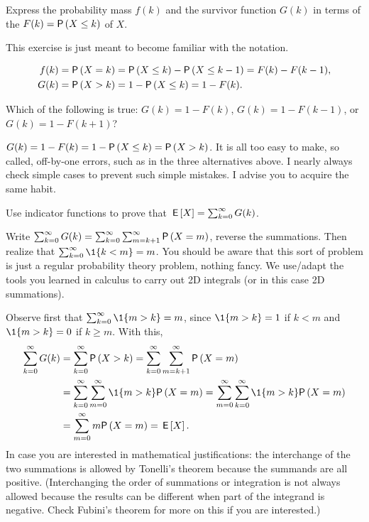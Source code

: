 \begin{exercise}
  Express the probability mass  $f(k)$ and the survivor function $G(k)$ in terms of the  $F(k)=\P{X\leq k}$ of $X$.
\begin{hint}
This exercise is just meant to become familiar with the notation.
\end{hint}
\begin{solution}
    \begin{align*}
    f(k) &= \P{X=k} = \P{X\leq k} - \P{X\leq k-1} = F(k)-F(k-1), \\
    G(k) &= \P{X>k} = 1 - \P{X\leq k} = 1-F(k).        
    \end{align*}
\end{solution}
\end{exercise}

\begin{extra}
  Which of the following is true: $G(k) = 1-F(k)$, $G(k) = 1-F(k-1)$, or $G(k) = 1-F(k+1)$?
\begin{solution}
  $G(k) = 1- F(k) = 1-\P{X\leq k} = \P{X>k}$. 
    It is all too easy to make, so called, off-by-one errors, such as
    in the three alternatives above.  I nearly always check simple
    cases to prevent such simple mistakes. I advise you to acquire the
    same habit.
\end{solution}
\end{extra}


\begin{extra}\label{ex:6}
 Use indicator functions to prove that $\,\mathsf{E}\left[X\right] =  \sum_{k=0}^\infty G(k)$.
\begin{hint}
Write 
$\sum_{k=0}^\infty G(k) = \sum_{k=0}^\infty \sum_{m=k+1}^\infty \P{X=m}$, reverse the summations. Then realize that $\sum_{k=0}^\infty \1{k<m} = m$. 
You should be aware that this sort of problem is just a regular probability
  theory problem, nothing fancy. We use/adapt the tools you learned in
  calculus to carry out 2D integrals (or in this case 2D summations).
\end{hint}
\begin{solution}
Observe first that $\sum_{k=0}^\infty \1{m>k} = m$, since $\1{m>k}=1$ if $k<m$ and $\1{m>k} = 0$ if $k\geq m$. With this, 
\begin{align*}
\sum_{k=0}^\infty G(k) 
&= \sum_{k=0}^\infty \P{X>k} 
= \sum_{k=0}^\infty \sum_{m=k+1}^\infty \P{X=m}  \\
& = \sum_{k=0}^\infty \sum_{m=0}^\infty \1{m>k} \P{X=m} 
= \sum_{m=0}^\infty \sum_{k=0}^\infty \1{m>k} \P{X=m} \\
&= \sum_{m=0}^\infty m\P{X=m} = \E X.
\end{align*}
In case you are interested in mathematical justifications: the interchange of the two summations is allowed by Tonelli's theorem because the summands are all positive.
(Interchanging the order of summations or integration is not always allowed because the results can be different when part of the integrand is negative.
Check Fubini's theorem for more on this if you are interested.)
\end{solution}
\end{extra}

